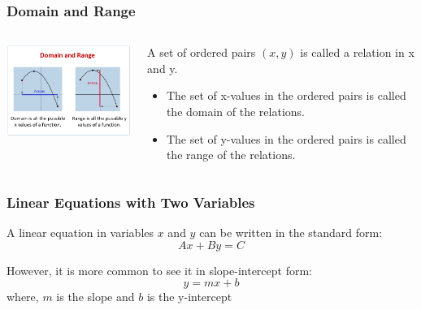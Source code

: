 \documentclass{beamer}
\begin{document}
\begin{frame}\frametitle{Domain and Range}
\begin{columns}
\begin{column}{6cm}
\begin{center}
\includegraphics[width=6cm]{fig/domain-range.png}
\end{center}
\end{column}

\begin{column}{5cm}
A set of ordered pairs $(x,y)$ is called a relation in x and y. 
\begin{itemize}
\item The set of x-values in the ordered pairs is called the domain of the relations.
\item The set of y-values in the ordered pairs is called the range of the relations.
\end{itemize}
\end{column}
\end{columns}
\end{frame}


\begin{frame}\frametitle{Linear Equations with Two Variables}
A linear equation in variables $x$ and $y$ can be written in the standard form:
\begin{equation}
Ax + By = C
\end{equation}

However, it is more common to see it in slope-intercept form:
\begin{equation}
y = mx + b
\end{equation}
where, $m$ is the slope and $b$ is the y-intercept
\end{frame}
\end{document}
